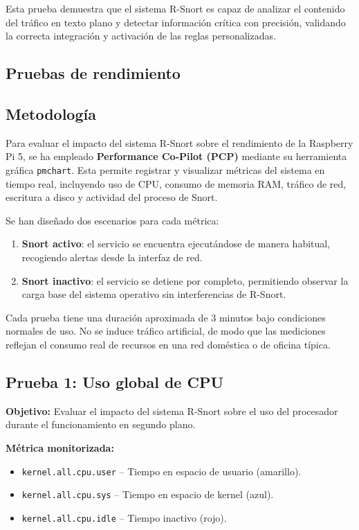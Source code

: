 \documentclass[11pt,a4paper,twoside]{report}
\begin{document}
Esta prueba demuestra que el sistema R-Snort es capaz de analizar el contenido del tráfico en texto plano y detectar información crítica con precisión, validando la correcta integración y activación de las reglas personalizadas.


\subsection{Pruebas de rendimiento}

\subsection*{Metodología}

Para evaluar el impacto del sistema R-Snort sobre el rendimiento de la Raspberry Pi 5, se ha empleado \textbf{Performance Co-Pilot (PCP)}\cite{pcp_project} mediante su herramienta gráfica \texttt{pmchart}. Esta permite registrar y visualizar métricas del sistema en tiempo real, incluyendo uso de CPU, consumo de memoria RAM, tráfico de red, escritura a disco y actividad del proceso de Snort.\newline

Se han diseñado dos escenarios para cada métrica:
\begin{enumerate}
	\item \textbf{Snort activo}: el servicio se encuentra ejecutándose de manera habitual, recogiendo alertas desde la interfaz de red.
	\item \textbf{Snort inactivo}: el servicio se detiene por completo, permitiendo observar la carga base del sistema operativo sin interferencias de R-Snort.
\end{enumerate}

Cada prueba tiene una duración aproximada de 3 minutos bajo condiciones normales de uso. No se induce tráfico artificial, de modo que las mediciones reflejan el consumo real de recursos en una red doméstica o de oficina típica.

\bigskip

\subsection*{Prueba 1: Uso global de CPU}

\textbf{Objetivo:}  
Evaluar el impacto del sistema R-Snort sobre el uso del procesador durante el funcionamiento en segundo plano.\newline

\textbf{Métrica monitorizada:}
\begin{itemize}
	\item \texttt{kernel.all.cpu.user} – Tiempo en espacio de usuario (amarillo).
	\item \texttt{kernel.all.cpu.sys} – Tiempo en espacio de kernel (azul).
	\item \texttt{kernel.all.cpu.idle} – Tiempo inactivo (rojo).
\end{itemize}
\end{document}
